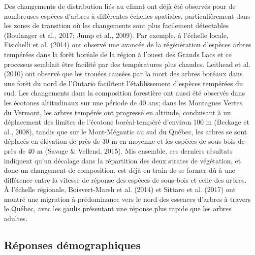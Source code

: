 \documentclass[
]{article}
\begin{document}
Des changements de distribution liés au climat ont déjà été observés
pour de nombreuses espèces d'arbres à différentes échelles spatiales,
particulièrement dans les zones de transition où les changements sont
plus facilement détectables (Boulanger et al., 2017; Jump et al., 2009).
Par exemple, à l'échelle locale, Fisichelli et al. (2014) ont observé
une avancée de la régénération d'espèces arbres tempérées dans la forêt
boréale de la région à l'ouest des Grands Lacs et ce processus semblait
être facilité par des températures plus chaudes. Leithead et al. (2010)
ont observé que les trouées causées par la mort des arbres boréaux dans
une forêt du nord de l'Ontario facilitent l'établissement d'espèces
tempérées du sud. Les changements dans la composition forestière ont
aussi été observés dans les écotones altitudinaux sur une période de 40
ans; dans les Montagnes Vertes du Vermont, les arbres tempérés ont
progressé en altitude, conduisant à un déplacement des limites de
l'écotone boréal-tempéré d'environ 100 m (Beckage et al., 2008), tandis
que sur le Mont-Mégantic au sud du Québec, les arbres se sont déplacés
en élévation de près de 30 m en moyenne et les espèces de sous-bois de
près de 40 m (Savage \& Vellend, 2015). Mis ensemble, ces derniers
résultats indiquent qu'un décalage dans la répartition des deux strates
de végétation, et donc un changement de composition, est déjà en train
de se former dû à une différence entre la vitesse de réponse des espèces
de sous-bois et celle des arbres. À l'échelle régionale, Boisvert-Marsh
et al. (2014) et Sittaro et al. (2017) ont montré une migration à
prédominance vers le nord des essences d'arbres à travers le Québec,
avec les gaulis présentant une réponse plus rapide que les arbres
adultes.

\hypertarget{ruxe9ponses-duxe9mographiques}{%
\subsection{Réponses
démographiques}\label{ruxe9ponses-duxe9mographiques}}
\end{document}
